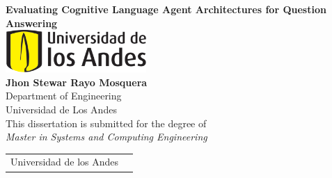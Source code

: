 \centering
\vspace*{0.5in}

{\huge \textbf{Evaluating Cognitive Language Agent Architectures for Question Answering}}\\[2.0cm]

\includegraphics[width=0.4\textwidth]{images/uniandes.pdf}\\[2.0cm]

{\Large \textbf{Jhon Stewar Rayo Mosquera}}\\[1.0cm]
{Department of Engineering}\\[0.1cm]
{Universidad de Los Andes}\\[2.0cm]

{This dissertation is submitted for the degree of}\\
{\emph{Master in Systems and Computing Engineering}}

\vfill

\begin{tabular}{@{}p{}@{}p{}@{}}
    \raggedright {Universidad de los Andes} & \raggedleft {January 2025}
\end{tabular}